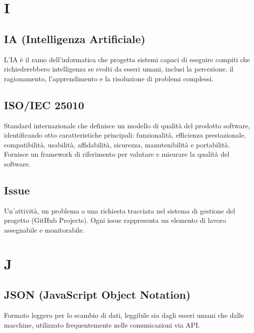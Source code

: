 \documentclass[a4paper, 11pt, oneside]{scrartcl} %
\begin{document}

\section*{I}


\subsection*{IA (Intelligenza Artificiale)}
L'IA è il ramo dell'informatica che progetta sistemi capaci di eseguire compiti che richiederebbero intelligenza se svolti da esseri umani, inclusi la percezione, il ragionamento, l'apprendimento e la risoluzione di problemi complessi.
\vspace{0.5cm}

\subsection*{ISO/IEC 25010}
Standard internazionale che definisce un modello di qualità del prodotto software, identificando otto caratteristiche principali: funzionalità, efficienza prestazionale, compatibilità, usabilità, affidabilità, sicurezza, manutenibilità e portabilità. Fornisce un framework di riferimento per valutare e misurare la qualità del software.
\vspace{0.5cm}

\subsection*{Issue}


Un'attività, un problema o una richiesta tracciata nel sistema di gestione del progetto (GitHub Projects). Ogni issue rappresenta un elemento di lavoro assegnabile e monitorabile.

\vspace{0.5cm}

\section*{J}

\subsection*{JSON (JavaScript Object Notation)}
Formato leggero per lo scambio di dati, leggibile sia dagli esseri umani che dalle macchine, utilizzato frequentemente nelle comunicazioni via API.
\vspace{0.5cm}
\end{document}
